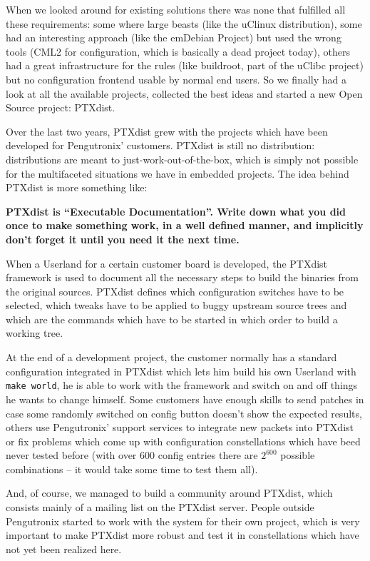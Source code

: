 When we looked around for existing solutions there was none that
fulfilled all these requirements: some where large beasts (like the
uClinux distribution), some had an interesting approach (like the
emDebian Project) but used the wrong tools (CML2 for configuration,
which is basically a dead project today), others had a great
infrastructure for the rules (like buildroot, part of the uClibc
project) but no configuration frontend usable by normal end users. So we
finally had a look at all the available projects, collected the best
ideas and started a new Open Source project: PTXdist. 

Over the last two years, PTXdist grew with the projects which have been
developed for Pengutronix' customers. PTXdist is still no distribution:
distributions are meant to just-work-out-of-the-box, which is simply not
possible for the multifaceted situations we have in embedded projects.
The idea behind PTXdist is more something like: 

\begin{important}
{\bf PTXdist is "`Executable Documentation"'. Write down what you 
did once to make something work, in a well defined manner, and
implicitly don't forget it until you need it the next time.}
\end{important}

When a Userland for a certain customer board is developed, the PTXdist
framework is used to document all the necessary steps to build the
binaries from the original sources. PTXdist defines which configuration
switches have to be selected, which tweaks have to be applied to buggy
upstream source trees and which are the commands which have to be
started in which order to build a working tree. 

At the end of a development project, the customer normally has a
standard configuration integrated in PTXdist which lets him build his
own Userland with \texttt{make~world}, he is able to work with the
framework and switch on and off things he wants to change himself. Some
customers have enough skills to send patches in case some randomly
switched on config button doesn't show the expected results, others use
Pengutronix' support services to integrate new packets into PTXdist or
fix problems which come up with configuration constellations which have
beed never tested before (with over 600 config entries there are $2^600$
possible combinations -- it would take some time to test them all). 

And, of course, we managed to build a community around PTXdist, which
consists mainly of a mailing list on the PTXdist server. People outside
Pengutronix started to work with the system for their own project, which
is very important to make PTXdist more robust and test it in
constellations which have not yet been realized here.  

